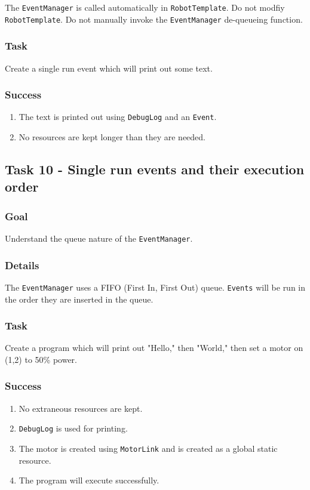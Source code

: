 \documentclass[a4paper]{article}
\begin{document}
The \lstinline{EventManager} is called automatically in \lstinline{RobotTemplate}. Do not modfiy \lstinline{RobotTemplate}. Do not manually invoke the \lstinline{EventManager} de-queueing function.
\subsubsection{Task} Create a single run event which will print out some text.
\subsubsection{Success} \begin{enumerate}\item{The text is printed out using \lstinline{DebugLog} and an \lstinline{Event}.}\item{No resources are kept longer than they are needed.}\end{enumerate}

\subsection{Task 10 - Single run events and their execution order}
\subsubsection{Goal} Understand the queue nature of the \lstinline{EventManager}.
\subsubsection{Details} The \lstinline{EventManager} uses a FIFO (First In, First Out) queue. \lstinline{Events} will be run in the order they are inserted in the queue.
\subsubsection{Task} Create a program which will print out "Hello," then "World," then set a motor on (1,2) to 50\% power.
\subsubsection{Success} \begin{enumerate}\item{No extraneous resources are kept.}\item{\lstinline{DebugLog} is used for printing.}\item{The motor is created using \lstinline{MotorLink} and is created as a global static resource.}\item{The program will execute successfully.}\end{enumerate}
\end{document}
